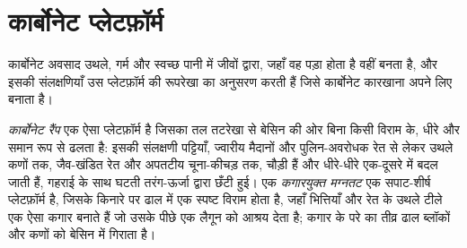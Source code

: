 \section{कार्बोनेट प्लेटफ़ॉर्म}\label{sec:b3:facies-models:carbonates}

कार्बोनेट अवसाद उथले, गर्म और स्वच्छ पानी में जीवों द्वारा,
जहाँ वह पड़ा होता है वहीं बनता है, और इसकी संलक्षणियाँ उस प्लेटफ़ॉर्म की रूपरेखा का अनुसरण करती हैं जिसे
कार्बोनेट कारखाना अपने लिए बनाता है।

\begin{definition}[कार्बोनेट रैंप और कगारयुक्त मग्नतट]\label{def:b3:facies-models:ramp}
\emph{कार्बोनेट रैंप} एक ऐसा प्लेटफ़ॉर्म है जिसका तल
तटरेखा से बेसिन की ओर बिना किसी विराम के, धीरे और समान रूप से ढलता है:
इसकी संलक्षणी पट्टियाँ, ज्वारीय मैदानों और पुलिन-अवरोधक रेत से लेकर उथले कणों तक,
जैव-खंडित रेत और अपतटीय चूना-कीचड़ तक, चौड़ी हैं और धीरे-धीरे एक-दूसरे में बदल जाती हैं,
गहराई के साथ घटती तरंग-ऊर्जा द्वारा छँटी हुई। एक \emph{कगारयुक्त
मग्नतट} एक सपाट-शीर्ष प्लेटफ़ॉर्म है, जिसके किनारे पर ढाल में एक स्पष्ट विराम होता है,
जहाँ भित्तियाँ और रेत के उथले टीले एक ऐसा कगार बनाते हैं जो
उसके पीछे एक लैगून को आश्रय देता है; कगार के परे का तीव्र ढाल ब्लॉकों और कणों को
बेसिन में गिराता है।
\end{definition}

